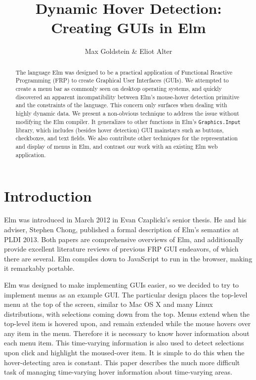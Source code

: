\documentclass{article}
\title{\textbf{Dynamic Hover Detection:\\Creating GUIs in Elm}}
\author{Max Goldstein \& Eliot Alter}
\makeatletter
\renewcommand{\maketitle}{ %
    \begin{flushright} %
        {\LARGE\@title} %

        \vspace{40pt} %

        {\large\@author} %

        \vspace{30pt} %
    \end{flushright}
}
\makeatother
\begin{document}
\thispagestyle{empty} %
\maketitle

\begin{abstract}
The language Elm was designed to be a practical application of
Functional Reactive Programming (FRP) to create Graphical User
Interfaces (GUIs). We attempted to create a menu bar as commonly seen on
desktop operating systems, and quickly discovered an apparent
incompatibility between Elm's mouse-hover detection primitive and the
constraints of the language. This concern only surfaces when dealing
with highly dynamic data. We present a non-obvious technique to address
the issue without modifying the Elm compiler. It generalizes to other
functions in Elm's \texttt{Graphics.Input} library, which includes
(besides hover detection) GUI mainstays such as buttons, checkboxes, and
text fields. We also contribute other techniques for the representation and
display of menus in Elm, and contrast our work with an existing Elm web
application.
\end{abstract}

\section{Introduction}\label{introduction}

Elm was introduced in March 2012 in Evan Czaplicki's senior thesis.
\cite{elm-thesis} He and his adviser, Stephen Chong, published a formal
description of Elm's semantics at PLDI 2013. \cite{CzaplickiC13} Both papers are
comprehensive overviews of Elm, and additionally provide excellent literature
reviews of previous FRP GUI endeavors, of which there are several. Elm compiles
down to JavaScript to run in the browser, making it remarkably portable.

Elm was designed to make implementing GUIs easier, so we decided to try to
implement menus as an example GUI. The particular design places the top-level
menu at the top of the screen, similar to Mac OS X and many Linux distributions,
with selections coming down from the top. Menus extend when the top-level item
is hovered upon, and remain extended while the mouse hovers over any item in the
menu. Therefore it is necessary to know hover information about each menu item.
This time-varying information is also used to detect selections upon click and
highlight the moused-over item. It is simple to do this when the hover-detecting
area is constant. This paper describes the much more difficult task of managing
time-varying hover information about time-varying areas.
\end{document}
